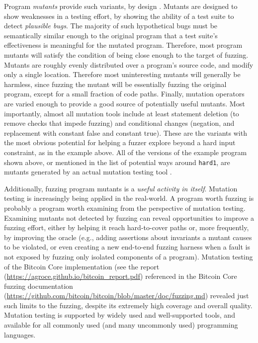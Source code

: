 Program \emph{mutants} provide such variants, by design \cite{MutationSurvey}.  Mutants are designed to show weaknesses in a testing effort, by showing
the ability of a test suite to detect \emph{plausible bugs}.  The majority of such hypothetical bugs must be semantically similar enough to
the original program that a test suite's effectiveness is meaningful for the mutated program.  Therefore, most program mutants
will satisfy the condition of being close enough to the target of fuzzing.  Mutants are roughly evenly distributed over a program's source code,
and modify only a single location.  Therefore most uninteresting mutants will generally be harmless, since fuzzing the mutant will be essentially
fuzzing the original program, except for a small fraction of code paths.  Finally, mutation operators are varied enough to provide a good source
of potentially useful mutants.  Most importantly, almost all mutation tools include at least statement deletion (to remove checks that impede
fuzzing) and conditional changes (negation, and replacement with constant false and constant true).  These are the variants with the most
obvious potential for helping a fuzzer explore beyond a hard input constraint, as in the example above.  All of the versions of the example program shown above, or mentioned in the list of potential ways around {\tt hard1}, are mutants generated by an actual mutation testing tool \cite{regexpMut}.

Additionally, fuzzing program mutants is a \emph{useful activity in itself}.  Mutation testing is increasingly being applied in the real-world.
A program worth fuzzing is probably a program worth examining from the perspective of mutation testing.  Examining mutants not detected by fuzzing
can reveal opportunities to improve a fuzzing effort, either by helping it reach hard-to-cover paths or, more frequently, by improving the oracle
(e.g., adding assertions about invariants a mutant causes to be violated, or even creating a new end-to-end fuzzing harness when a fault is
not exposed by fuzzing only isolated components of a program).  Mutation testing of the Bitcoin Core implementation (see the report
(\url{https://agroce.github.io/bitcoin_report.pdf}) referenced in the Bitcoin Core fuzzing documentation
(\url{https://github.com/bitcoin/bitcoin/blob/master/doc/fuzzing.md}) revealed just such limits to the fuzzing, despite its 
extremely high coverage and overall quality.  Mutation testing is supported by widely used and well-supported tools, and available for all
commonly used (and many uncommonly used) programming languages.

